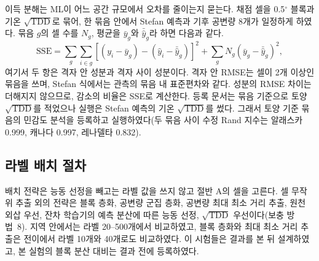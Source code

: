 이득 분해는 ML이 어느 공간 규모에서 오차를 줄이는지 묻는다. 채점 셀을 0.5$^{\circ}$ 블록과 기온 $\sqrt{\mathrm{TDD}}$로 묶어, 한 묶음 안에서 Stefan 예측과 기후 공변량 8개가 일정하게 하였다. 묶음 $g$의 셀 수를 $N_g$, 평균을 $\bar{y}_g$와 $\bar{\hat{y}}_g$라 하면 다음과 같다.
\begin{equation}
\mathrm{SSE} = \sum_g \sum_{i \in g} \left[(y_i - \bar{y}_g) - (\hat{y}_i - \bar{\hat{y}}_g)\right]^2 + \sum_g N_g \left(\bar{y}_g - \bar{\hat{y}}_g\right)^2,
\label{eq:decomp}
\end{equation}
여기서 두 항은 격자 안 성분과 격자 사이 성분이다. 격자 안 RMSE는 셀이 2개 이상인 묶음을 쓰며, Stefan 식에서는 관측의 묶음 내 표준편차와 같다. 성분의 RMSE 차이는 더해지지 않으므로, 감소의 비율은 SSE로 계산한다. 등록 문서는 묶음 기준으로 토양 $\sqrt{\mathrm{TDD}}$를 적었으나 실행은 Stefan 예측의 기온 $\sqrt{\mathrm{TDD}}$를 썼다. 그래서 토양 기준 묶음의 민감도 분석을 등록하고 실행하였다(두 묶음 사이 수정 Rand 지수는 알래스카 0.999, 캐나다 0.997, 레나델타 0.832).

\subsection{라벨 배치 절차}\label{sec:m-placement}

배치 전략은 능동 선정을 빼고는 라벨 값을 쓰지 않고 절반 A의 셀을 고른다. 셀 무작위 추출 외의 전략은 블록 층화, 공변량 군집 층화, 공변량 최대 최소 거리 추출, 원천 외삽 우선, 잔차 학습기의 예측 분산에 따른 능동 선정, $\sqrt{\mathrm{TDD}}$ 우선이다(보충 방법~8). 지역 안에서는 라벨 20--500개에서 비교하였고, 블록 층화와 최대 최소 거리 추출은 전이에서 라벨 10개와 40개로도 비교하였다. 이 시험들은 결과를 본 뒤 설계하였고, 본 실험의 블록 분산 대비는 결과 전에 등록하였다.


